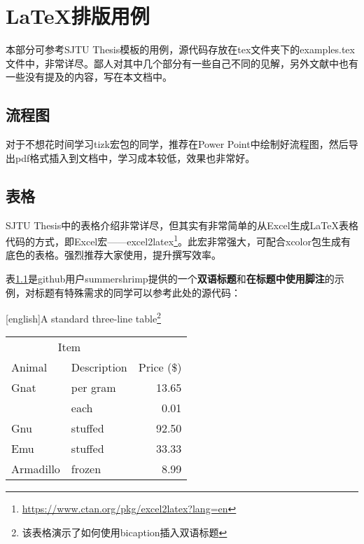 
\chapter{\LaTeX 排版用例}\label{chap:example}

本部分可参考SJTU Thesis模板\cite{SJTUThesis}的用例，源代码存放在tex文件夹下的examples.tex文件中，非常详尽。鄙人对其中几个部分有一些自己不同的见解，另外文献中也有一些没有提及的内容，写在本文档中。

\section{流程图}

对于不想花时间学习tizk宏包的同学，推荐在Power Point中绘制好流程图，然后导出pdf格式插入到文档中，学习成本较低，效果也非常好。

\section{表格}

SJTU Thesis中的表格介绍非常详尽，但其实有非常简单的从Excel生成\LaTeX 表格代码的方式，即Excel宏——excel2latex\footnote{\url{https://www.ctan.org/pkg/excel2latex?lang=en}}。此宏非常强大，可配合xcolor包生成有底色的表格。强烈推荐大家使用，提升撰写效率。

\begin{savenotes} %

表\ref{tab:bicap}是github用户summershrimp提供的一个\textbf{双语标题}和\textbf{在标题中使用脚注}的示例，对标题有特殊需求的同学可以参考此处的源代码：
\begin{table}[H]
  \centering
  [english]{A standard three-line table\footnote{该表格演示了如何使用bicaption插入双语标题}}
  \label{tab:bicap}
  \begin{tabular}{@{}llr@{}} \toprule
    \multicolumn{2}{c}{Item} \\ \cmidrule(r){1-2}
    Animal & Description & Price (\$)\\ \midrule
    Gnat & per gram & 13.65 \\
    & each & 0.01 \\
    Gnu & stuffed & 92.50 \\
    Emu & stuffed & 33.33 \\
    Armadillo & frozen & 8.99 \\ \bottomrule
  \end{tabular}
\end{table}
    
\end{savenotes}

